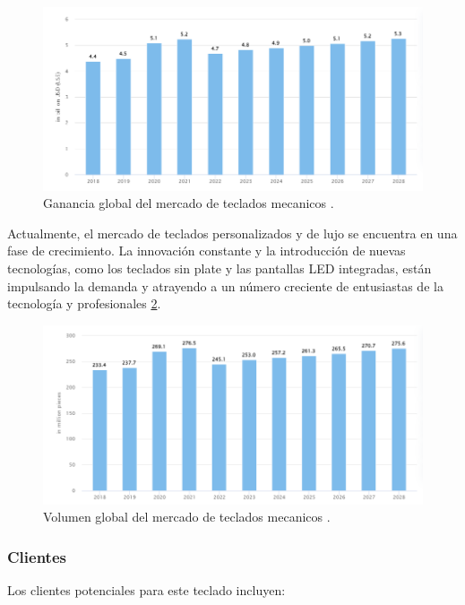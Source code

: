 \begin{figure}[H]
    \centering
    \includegraphics[width=1\textwidth]{imagenes/Capitulos/Cap12/RevenueKeyboardsWW.png}
    \caption{Ganancia global del mercado de teclados mecanicos \cite{Comercial1}.}
    \label{fig:RevenueWW}
\end{figure}

Actualmente, el mercado de teclados personalizados y de lujo se encuentra en una fase de crecimiento. La innovación constante y la introducción de nuevas tecnologías, como los teclados sin plate y las pantallas LED integradas, están impulsando la demanda y atrayendo a un número creciente de entusiastas de la tecnología y profesionales \ref{fig:VolumenWW}.

\begin{figure}[H]
    \centering
    \includegraphics[width=1\textwidth]{imagenes/Capitulos/Cap12/VolumenKeyboard.png}
    \caption{Volumen global del mercado de teclados mecanicos \cite{Comercial1}.}
    \label{fig:VolumenWW}
\end{figure}

\subsubsection{Clientes}

Los clientes potenciales para este teclado incluyen:

